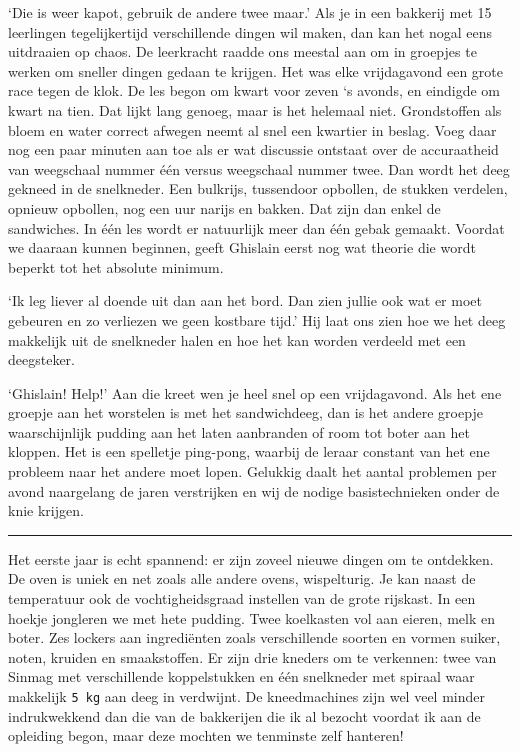 \documentclass[
  11pt,
  dutch,
]{memoir}
\begin{document}
`Die is weer kapot, gebruik de andere twee maar.' Als je in een bakkerij
met 15 leerlingen tegelijkertijd verschillende dingen wil maken, dan kan
het nogal eens uitdraaien op chaos. De leerkracht raadde ons meestal aan
om in groepjes te werken om sneller dingen gedaan te krijgen. Het was
elke vrijdagavond een grote race tegen de klok. De les begon om kwart
voor zeven `s avonds, en eindigde om kwart na tien. Dat lijkt lang
genoeg, maar is het helemaal niet. Grondstoffen als bloem en water
correct afwegen neemt al snel een kwartier in beslag. Voeg daar nog een
paar minuten aan toe als er wat discussie ontstaat over de accuraatheid
van weegschaal nummer één versus weegschaal nummer twee. Dan wordt het
deeg gekneed in de snelkneder. Een bulkrijs, tussendoor opbollen, de
stukken verdelen, opnieuw opbollen, nog een uur narijs en bakken. Dat
zijn dan enkel de sandwiches. In één les wordt er natuurlijk meer dan
één gebak gemaakt. Voordat we daaraan kunnen beginnen, geeft Ghislain
eerst nog wat theorie die wordt beperkt tot het absolute minimum.

`Ik leg liever al doende uit dan aan het bord. Dan zien jullie ook wat
er moet gebeuren en zo verliezen we geen kostbare tijd.' Hij laat ons
zien hoe we het deeg makkelijk uit de snelkneder halen en hoe het kan
worden verdeeld met een deegsteker.

`Ghislain! Help!' Aan die kreet wen je heel snel op een vrijdagavond.
Als het ene groepje aan het worstelen is met het sandwichdeeg, dan is
het andere groepje waarschijnlijk pudding aan het laten aanbranden of
room tot boter aan het kloppen. Het is een spelletje ping-pong, waarbij
de leraar constant van het ene probleem naar het andere moet lopen.
Gelukkig daalt het aantal problemen per avond naargelang de jaren
verstrijken en wij de nodige basistechnieken onder de knie krijgen.

\pfbreak

Het eerste jaar is echt spannend: er zijn zoveel nieuwe dingen om te
ontdekken. De oven is uniek en net zoals alle andere ovens, wispelturig.
Je kan naast de temperatuur ook de vochtigheidsgraad instellen van de
grote rijskast. In een hoekje jongleren we met hete pudding. Twee
koelkasten vol aan eieren, melk en boter. Zes lockers aan ingrediënten
zoals verschillende soorten en vormen suiker, noten, kruiden en
smaakstoffen. Er zijn drie kneders om te verkennen: twee van Sinmag met
verschillende koppelstukken en één snelkneder met spiraal waar makkelijk
\texttt{5\ kg} aan deeg in verdwijnt. De kneedmachines zijn wel veel
minder indrukwekkend dan die van de bakkerijen die ik al bezocht voordat
ik aan de opleiding begon, maar deze mochten we tenminste zelf hanteren!
\end{document}
